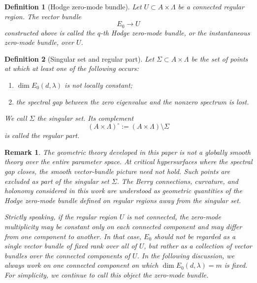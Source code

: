 \documentclass[pdflatex,sn-mathphys-num]{sn-jnl}%
\theoremstyle{thmstyleone}%
\theoremstyle{thmstyletwo}%
\newtheorem{remark}{Remark}%
\theoremstyle{thmstylethree}%
\newtheorem{definition}{Definition}%
\begin{document}
\begin{definition}[Hodge zero-mode bundle]
Let \(U\subset A\times\Lambda\) be a connected regular region. The vector bundle
\[
E_0\to U
\]
constructed above is called the \emph{\(q\)-th Hodge zero-mode bundle}, or the
\emph{instantaneous zero-mode bundle}, over \(U\).
\end{definition}

\begin{definition}[Singular set and regular part]
Let \(\Sigma\subset A\times\Lambda\) be the set of points at which at least one
of the following occurs:
\begin{enumerate}
    \item \(\dim E_0(d,\lambda)\) is not locally constant;
    \item the spectral gap between the zero eigenvalue and the nonzero spectrum
    is lost.
\end{enumerate}
We call \(\Sigma\) the \emph{singular set}. Its complement
\[
(A\times\Lambda)^\circ
:=
(A\times\Lambda)\setminus\Sigma
\]
is called the \emph{regular part}.
\end{definition}


\begin{remark}
The geometric theory developed in this paper is not a globally smooth theory
over the entire parameter space. At critical hypersurfaces where the spectral gap closes, the smooth vector-bundle picture need not hold.
Such points are excluded as part of the singular set \(\Sigma\). The Berry
connections, curvature, and holonomy considered in this work are understood as
geometric quantities of the Hodge zero-mode bundle defined on regular regions
away from the singular set.

Strictly speaking, if the regular region \(U\) is not connected, the
zero-mode multiplicity may be constant only on each connected component and
may differ from one component to another. In that case, \(E_0\) should not be
regarded as a single vector bundle of fixed rank over all of \(U\), but rather as
a collection of vector bundles over the connected components of \(U\). In the
following discussion, we always work on one connected component on which
\(\dim E_0(d,\lambda)=m\) is fixed. For simplicity, we continue to call this object
the zero-mode bundle.
\end{remark}
\end{document}
